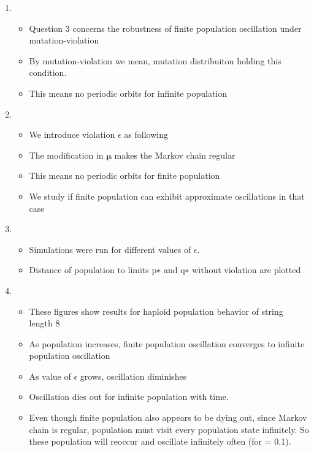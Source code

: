 \documentclass{article}
\begin{document}
\begin{enumerate}
\item
  \begin{itemize}
  \item Question 3 concerns the robustness of finite population oscillation under mutation-violation
  \item By mutation-violation we mean, mutation distribuiton holding this condition.
  \item This means no periodic orbits for infinite population
  \end{itemize}

\item
  \begin{itemize}
  \item We introduce violation $\epsilon$ as following
  \item The modification in $\bm{\mu}$ makes the Markov chain regular 
  \item This means no periodic orbits for finite population  
  \item We study if finite population can exhibit approximate oscillations in that case 
  \end{itemize}
  
\item
  \begin{itemize}
  \item Simulations were run for different values of $\epsilon$.
  \item Distance of population to limits p∗ and q∗ without violation are plotted  
  \end{itemize}
  
\item
  \begin{itemize}
  \item These figures show results for haploid population behavior of string length 8
  \item As population increases, finite population oscillation converges to infinite population oscillation
  \item As value of $\epsilon$ grows, oscillation diminishes
  \item Oscillation dies out for infinite population with time.
  \item Even though finite population also appears to be dying out, since Markov chain is regular, population must visit every population state infinitely. 
  So these population will reoccur and oscillate infinitely often (for = 0.1).  
  \end{itemize}
  

\end{enumerate}
\end{document}

